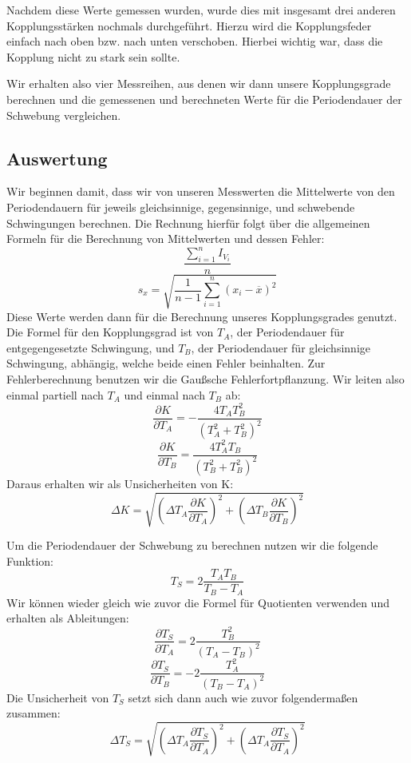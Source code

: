\documentclass[11pt,a4paper]{article}
\newcommand\mean{\begin{equation}
\frac{\sum_{i=1}^n I_{V_i}}{n}\label{mean}
\end{equation}}
\newcommand\meanstd{\begin{equation}
s_x=\sqrt{\frac{1}{n-1}\sum_{i=1}^n(x_i-\overline{x})^2}\label{meanstd}
\end{equation}}
\begin{document}
Nachdem diese Werte gemessen wurden, wurde dies mit insgesamt drei anderen Kopplungsst\"arken nochmals durchgef\"uhrt. Hierzu wird die Kopplungsfeder einfach nach oben bzw. nach unten verschoben. Hierbei wichtig war, dass die Kopplung nicht zu stark sein sollte.

Wir erhalten also vier Messreihen, aus denen wir dann unsere Kopplungsgrade berechnen und die gemessenen und berechneten Werte f\"ur die Periodendauer der Schwebung vergleichen.

\pagebreak

\subsection{Auswertung}

Wir beginnen damit, dass wir von unseren Messwerten die Mittelwerte von den Periodendauern f\"ur jeweils gleichsinnige, gegensinnige, und schwebende Schwingungen berechnen. Die Rechnung hierf\"ur folgt \"uber die allgemeinen Formeln f\"ur die Berechnung von Mittelwerten und dessen Fehler:
\mean
\meanstd
Diese Werte werden dann f\"ur die Berechnung unseres Kopplungsgrades genutzt. Die Formel f\"ur den Kopplungsgrad ist von $T_A$, der Periodendauer f\"ur entgegengesetzte Schwingung, und $T_B$, der Periodendauer f\"ur gleichsinnige Schwingung, abh\"angig, welche beide einen Fehler beinhalten. Zur Fehlerberechnung benutzen wir die Gau\ss sche Fehlerfortpflanzung.
Wir leiten also einmal partiell nach $T_A$ und einmal nach $T_B$ ab:
\[
	\frac{\partial K}{\partial T_A}=-\frac{4T_AT_B^2}{(T_A^2+T_B^2)^2}
\]
\[
	\frac{\partial K}{\partial T_B}=\frac{4T_A^2T_B}{(T_B^2+T_B^2)^2}
\]
Daraus erhalten wir als Unsicherheiten von K:
\begin{equation}
	\Delta K=\sqrt{\left(\Delta T_A\frac{\partial K}{\partial T_A}\right)^2+\left(\Delta T_B\frac{\partial K}{\partial T_B}\right)^2}
\end{equation}

Um die Periodendauer der Schwebung zu berechnen nutzen wir die folgende Funktion:
\begin{equation}
	T_S=2\frac{T_AT_B}{T_B-T_A}
\end{equation}
Wir k\"onnen wieder gleich wie zuvor die Formel f\"ur Quotienten verwenden und erhalten als Ableitungen:
\[
	\frac{\partial T_S}{\partial T_A}=2\frac{T_B^2}{(T_A-T_B)^2}
\]
\[
	\frac{\partial T_S}{\partial T_B}=-2\frac{T_A^2}{(T_B-T_A)^2}
\]
Die Unsicherheit von $T_S$ setzt sich dann auch wie zuvor folgenderma\ss en zusammen:
\begin{equation}
	\Delta T_S=\sqrt{\left(\Delta T_A\frac{\partial T_S}{\partial T_A}\right)^2+\left(\Delta T_A\frac{\partial T_S}{\partial T_A}\right)^2}
\end{equation}
\end{document}
